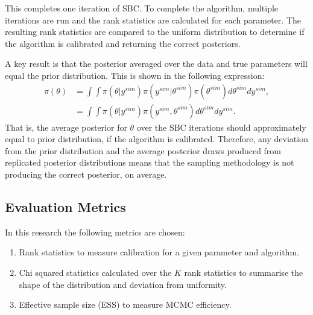 \documentclass[12pt, a4paper]{article}
\begin{document}
        This completes one iteration of SBC. To complete the algorithm, multiple iterations are run and the rank statistics are calculated for each parameter. The resulting rank statistics are compared to the uniform distribution to determine if the algorithm is calibrated and returning the correct posteriors.

        A key result is that the posterior averaged over the data and true parameters will equal the prior distribution. This is shown in the following expression:
        \begin{align}
        \pi(\theta) &= \int \int \pi(\theta|y^{sim}) \pi(y^{sim}|\theta^{sim}) \pi(\theta^{sim})d\theta^{sim} dy^{sim}, \\
        &= \int \int \pi(\theta|y^{sim}) \pi(y^{sim},\theta^{sim}) d\theta^{sim} dy^{sim}.
        \end{align}
        That is, the average posterior for $\theta$ over the SBC iterations should approximately equal to prior distribution, if the algorithm is calibrated. Therefore, any deviation from the prior distribution and the average posterior draws produced from replicated posterior distributions means that the sampling methodology is not producing the correct posterior, on average.

        

    \subsection{Evaluation Metrics}
        In this research the following metrics are chosen:

        \begin{enumerate}
            \item Rank statistics to measure calibration for a given parameter and algorithm.
            
            \item Chi squared statistics calculated over the $K$ rank statistics to summarise the shape of the distribution and deviation from uniformity.

            \item Effective sample size (ESS) to measure MCMC efficiency.
        \end{enumerate}
\end{document}
